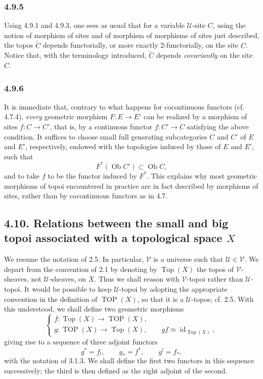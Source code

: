 \documentclass[11pt]{article}
\newcommand{\U}{\mathcal{U}}
\newcommand{\V}{\mathcal{V}}
\newcommand{\Top}{\operatorname{Top}}
\newcommand{\TOP}{\operatorname{TOP}}
\newcommand{\Ob}{\operatorname{Ob}}
\newcommand{\id}{\operatorname{id}}
\providecommand{\Ob}{\operatorname{Ob}}
\begin{document}
\subsubsection*{4.9.5}
Using 4.9.1 and 4.9.3, one sees as usual that for a variable \(\U\)-site \(C\), using the notion of morphism of sites and of morphism of morphisms of sites just described, the topos \(\widetilde C\) depends functorially, or more exactly 2-functorially, on the site \(C\). Notice that, with the terminology introduced, \(\widetilde C\) depends \emph{covariantly} on the site \(C\).

\subsubsection*{4.9.6}
It is immediate that, contrary to what happens for cocontinuous functors (cf. 4.7.4), \emph{every} geometric morphism \(F:E\to E'\) can be realized by a morphism of sites \(f:C\to C'\), that is, by a continuous functor \(f:C'\to C\) satisfying the above condition. It suffices to choose small full generating subcategories \(C\) and \(C'\) of \(E\) and \(E'\), respectively, endowed with the topologies induced by those of \(E\) and \(E'\), such that
\[
F^\ast(\Ob C')\subset\Ob C,
\]
and to take \(f\) to be the functor induced by \(F^\ast\). This explains why most geometric morphisms of topoi encountered in practice are in fact described by morphisms of sites, rather than by cocontinuous functors as in 4.7.

\subsection*{4.10. Relations between the small and big topoi associated with a topological space \(X\)}
We resume the notation of 2.5. In particular, \(\V\) is a universe such that \(\U\in\V\). We depart from the convention of 2.1 by denoting by \(\Top(X)\) the topos of \(\V\)-sheaves, not \(\U\)-sheaves, on \(X\). Thus we shall reason with \(\V\)-topoi rather than \(\U\)-topoi. It would be possible to keep \(\U\)-topoi by adopting the appropriate convention in the definition of \(\TOP(X)\), so that it is a \(\U\)-topos; cf. 2.5. With this understood, we shall define two geometric morphisms
\[
\begin{cases}
 f:\Top(X)\longrightarrow\TOP(X),\\
 g:\TOP(X)\longrightarrow\Top(X),\qquad gf\simeq\id_{\Top(X)},
\end{cases}\tag{4.10.1}
\]
giving rise to a sequence of three adjoint functors
\[
g^\ast=f_!,\qquad g_\ast=f^\ast,
\qquad g^!=f_\ast,\tag{4.10.1.1}
\]
with the notation of 3.1.3. We shall define the first two functors in this sequence successively; the third is then defined as the right adjoint of the second.
\end{document}
